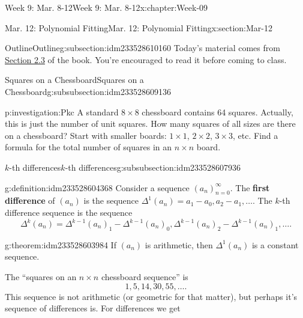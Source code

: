 \documentclass[oneside,10pt,]{book}
\newcommand{\terminology}[1]{\textbf{#1}}
\numberwithin{equation}{section}
\begin{document}
\begin{chapterptx}{Week 9: Mar. 8-12}{}{Week 9: Mar. 8-12}{}{}{x:chapter:Week-09}
\begin{sectionptx}{Mar. 12: Polynomial Fitting}{}{Mar. 12: Polynomial Fitting}{}{}{x:section:Mar-12}
\typeout{************************************************}
%
\begin{subsectionptx}{Outline}{}{Outline}{}{}{g:subsection:idm233528610160}
Today's material comes from \href{http://discrete.openmathbooks.org/dmoi3/sec_polyfit.html}{Section 2.3} of the book. You're encouraged to read it before coming to class.%
%
%
\typeout{************************************************}
\typeout{************************************************}
%
\begin{subsubsectionptx}{Squares on a Chessboard}{}{Squares on a Chessboard}{}{}{g:subsubsection:idm233528609136}
\begin{investigation}{}{p:investigation:Pkc}%
A standard \(8 \times 8\) chessboard contains 64 squares. Actually, this is just the number of unit squares. How many squares of all sizes are there on a chessboard? Start with smaller boards: \(1\times 1\), \(2 \times 2\), \(3\times 3\), etc. Find a formula for the total number of squares in an \(n\times n\) board.%
\end{investigation}%
%
%
\typeout{************************************************}
\typeout{************************************************}
%
\begin{subsubsectionptx}{\(k\)-th differences}{}{\(k\)-th differences}{}{}{g:subsubsection:idm233528607936}
\begin{definition}{}{g:definition:idm233528604368}%
Consider a sequence \((a_n)_{n=0}^\infty\). The \terminology{first difference} of \((a_n)\) is the sequence \(\Delta^1(a_n) = a_1 - a_0, a_2 - a_1, \ldots\). The \(k\)-th difference sequence is the sequence%
\begin{equation*}
\Delta^k(a_n) = \Delta^{k-1}(a_n)_1 - \Delta^{k-1}(a_n)_0, \Delta^{k-1}(a_n)_2 - \Delta^{k-1}(a_n)_1,  \ldots.
\end{equation*}
%
\end{definition}
\begin{theorem}{}{}{g:theorem:idm233528603984}%
If \((a_n)\) is arithmetic, then \(\Delta^1(a_n)\) is a constant sequence.%
\end{theorem}
The ``squares on an \(n\times n\) chessboard sequence'' is%
%
\begin{equation*}
1, 5, 14, 30, 55, \ldots.
\end{equation*}
This sequence is not arithmetic (or geometric for that matter), but perhaps it's sequence of differences is. For differences we get%

\end{subsubsectionptx}
\end{subsubsectionptx}
\end{subsectionptx}
\end{sectionptx}
\end{chapterptx}
\end{document}
